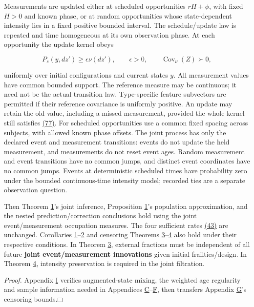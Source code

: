 \documentclass[11pt]{article}
\providecommand{\square}{\mdlgwhtsquare}
\begin{document}
Measurements are updated either at scheduled opportunities \(rH+\phi\), with fixed \(H>0\) and known phase, or at random opportunities whose state-dependent intensity lies in a fixed positive bounded interval. The schedule/update law is repeated and time homogeneous at its own observation phase. At each opportunity the update kernel obeys

\begin{equation*}
P_s(y,dz')\geq\epsilon\nu(dz'),\qquad \epsilon>0,
\qquad \operatorname{Cov}_{\nu}(Z)\succ0,
\tag{77}\label{eq:77}
\end{equation*}

uniformly over initial configurations and current states \(y\). All measurement values have common bounded support. The reference measure may be continuous; it need not be the actual transition law. Type-specific feature subvectors are permitted if their reference covariance is uniformly positive. An update may retain the old value, including a missed measurement, provided the whole kernel still satisfies \hyperref[eq:77]{(77)}. For scheduled opportunities use a common fixed spacing across subjects, with allowed known phase offsets. The joint process has only the declared event and measurement transitions: events do not update the held measurement, and measurements do not reset event ages. Random measurement and event transitions have no common jumps, and distinct event coordinates have no common jumps. Events at deterministic scheduled times have probability zero under the bounded continuous-time intensity model; recorded ties are a separate observation question.

Then Theorem \hyperref[res:Theorem-1]{1}'s joint inference, Proposition \hyperref[res:Proposition-1]{1}'s population approximation, and the nested prediction/correction conclusions hold using the joint event/measurement occupation measures. The four sufficient rates \hyperref[eq:43]{(43)} are unchanged. Corollaries \hyperref[res:Corollary-1]{1}--\hyperref[res:Corollary-2]{2} and censoring Theorems \hyperref[res:Theorem-3]{3}--\hyperref[res:Theorem-4]{4} also hold under their respective conditions. In Theorem \hyperref[res:Theorem-3]{3}, external fractions must be independent of all future \textbf{joint event/measurement innovations} given initial frailties/design. In Theorem \hyperref[res:Theorem-4]{4}, intensity preservation is required in the joint filtration.

\textit{Proof.} Appendix \hyperref[sec:I]{I} verifies augmented-state mixing, the weighted age regularity and sample information needed in Appendices \hyperref[sec:C]{C}--\hyperref[sec:F]{F}, then transfers Appendix \hyperref[sec:G]{G}'s censoring bounds.\hfill$\square$
\end{document}
